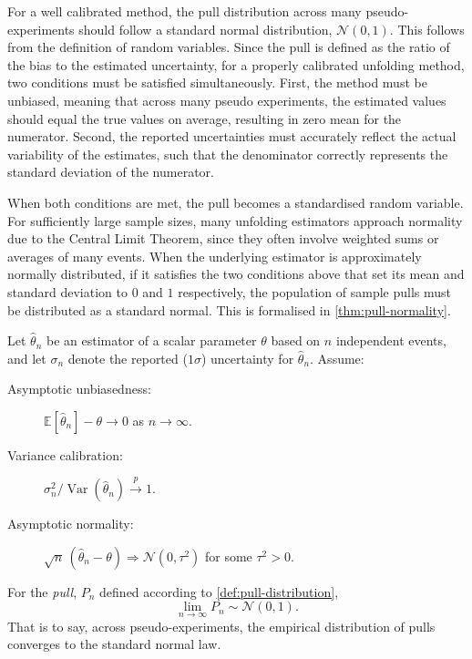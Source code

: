            For a well calibrated method, the pull distribution across many pseudo-experiments should follow a standard normal distribution, \(\mathcal{N}(0,1)\).
            This follows from the definition of random variables.
            Since the pull is defined as the ratio of the bias to the estimated uncertainty, for a properly calibrated unfolding method, two conditions must be satisfied simultaneously.
            First, the method must be unbiased, meaning that across many pseudo experiments, the estimated values should equal the true values on average, resulting in zero mean for the numerator.
            Second, the reported uncertainties must accurately reflect the actual variability of the estimates, such that the denominator correctly represents the standard deviation of the numerator.
            
            When both conditions are met, the pull becomes a standardised random variable.
            For sufficiently large sample sizes, many unfolding estimators approach normality due to the Central Limit Theorem, since they often involve weighted sums or averages of many events.
            When the underlying estimator is approximately normally distributed, if it satisfies the two conditions above that set its mean and standard deviation to \(0\) and \(1\) respectively, the population of sample pulls must be distributed as a standard normal.
            This is formalised in \cref{thm:pull-normality}.

            \begin{theorem}
            \label{thm:pull-normality}
            Let \(\hat\theta_n\) be an estimator of a scalar parameter \(\theta\) based on \(n\) independent events, and let \(\sigma_n\) denote the reported (\(1\sigma\)) uncertainty for \(\hat\theta_n\). Assume:
            \begin{description}
                \item[Asymptotic unbiasedness:] \(\mathbb{E}[\hat\theta_n] - \theta \to 0\) as \(n\to\infty\).
                \item[Variance calibration:] \(\sigma_n^2 / \operatorname{Var}(\hat\theta_n) \xrightarrow{\,p\,} 1\).
                \item[Asymptotic normality:] \(\sqrt{n}\,(\hat\theta_n-\theta) \Rightarrow \mathcal N(0,\tau^2)\) for some \(\tau^2>0\).
            \end{description}
            For the \emph{pull}, \(P_n\) defined according to \cref{def:pull-distribution},
            \begin{equation}
                \lim_{n\to\infty} P_n \sim \mathcal N(0,1).
            \end{equation}
            That is to say, across pseudo-experiments, the empirical distribution of pulls converges to the standard normal law.
            \end{theorem}

